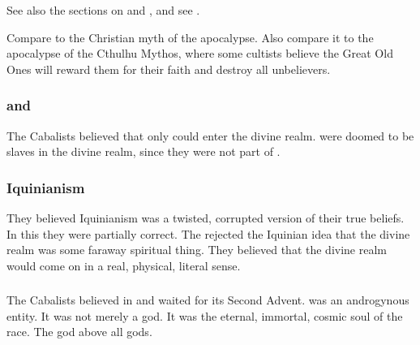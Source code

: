 See also the sections on  and , and see . 

Compare to the Christian myth of the apocalypse. 
Also compare it to the apocalypse of the Cthulhu Mythos, where some cultists believe the Great Old Ones will reward them for their faith and destroy all unbelievers. 






\subsubsection{\Humans and \scathae}
The Cabalists believed that only \humans could enter the divine realm. 
\Scathae were doomed to be slaves in the divine realm, since they were not part of \Lithrim. 





\subsubsection{Iquinianism}
They believed Iquinianism was a twisted, corrupted version of their true beliefs. 
In this they were partially correct.
The rejected the Iquinian idea that the divine realm was some faraway spiritual thing. 
They believed that the divine realm would come on \Miith in a real, physical, literal sense. 





\subsubsection{\Lithrim}
The Cabalists believed in \Lithrim and waited for its Second Advent. 
\Lithrim was an androgynous entity.
It was not merely a god.
It was the eternal, immortal, cosmic soul of the \human race.
The god above all gods. 






